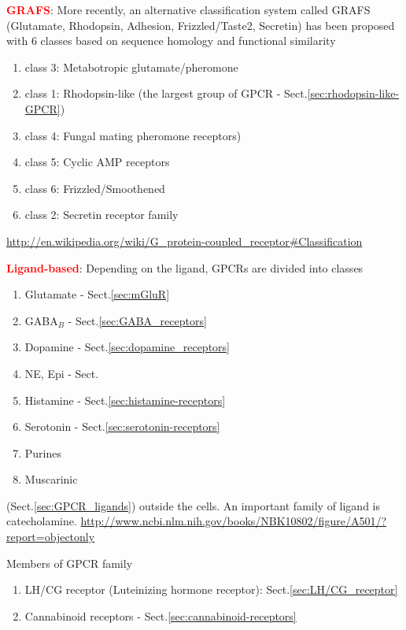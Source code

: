 \textcolor{red}{\bf GRAFS}: More recently, an alternative classification system
called GRAFS (Glutamate, Rhodopsin, Adhesion, Frizzled/Taste2, Secretin) has
been proposed with 6 classes based on  sequence homology and functional
similarity
\begin{enumerate}
  \item class 3: Metabotropic glutamate/pheromone
  
  \item class 1: Rhodopsin-like (the largest group of GPCR - Sect.\ref{sec:rhodopsin-like-GPCR})

  \item class 4: Fungal mating pheromone receptors)
  \item class 5: Cyclic AMP receptors
  \item class 6: Frizzled/Smoothened
  \item class 2: Secretin receptor family
\end{enumerate}
\url{http://en.wikipedia.org/wiki/G_protein-coupled_receptor#Classification}


\textcolor{red}{\bf Ligand-based}: Depending on the ligand, GPCRs
are divided into classes
\begin{enumerate}
  \item Glutamate - Sect.\ref{sec:mGluR}
  \item GABA$_B$ - Sect.\ref{sec:GABA_receptors}
  \item Dopamine - Sect.\ref{sec:dopamine_receptors}
  \item NE, Epi - Sect.
  \item Histamine - Sect.\ref{sec:histamine-receptors}
  \item Serotonin - Sect.\ref{sec:serotonin-receptors}
  \item Purines
  \item Muscarinic
\end{enumerate}
(Sect.\ref{sec:GPCR_ligands}) outside the cells. An important family of ligand
is catecholamine.
\url{http://www.ncbi.nlm.nih.gov/books/NBK10802/figure/A501/?report=objectonly}

Members of GPCR family
\begin{enumerate}
  \item LH/CG receptor (Luteinizing hormone receptor):
  Sect.\ref{sec:LH/CG_receptor} 
  
  \item Cannabinoid receptors - Sect.\ref{sec:cannabinoid-receptors}
\end{enumerate}



